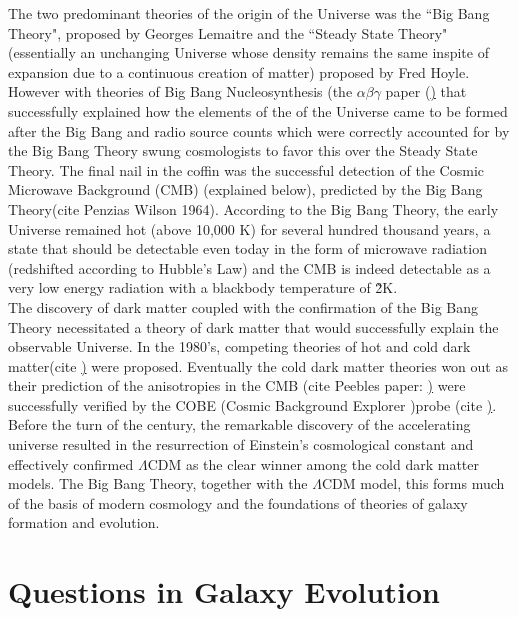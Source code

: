 The two predominant theories of the origin of the Universe was the ``Big Bang Theory", proposed by Georges Lemaitre and the ``Steady State Theory"(essentially an unchanging Universe whose density remains the same inspite of expansion due to a continuous creation of matter) proposed by Fred Hoyle. However with theories of Big Bang Nucleosynthesis (the $\alpha\beta\gamma$ paper (\href{http://adsabs.harvard.edu/abs/1948PhRv...73..803A}) that successfully explained how the elements of the of the Universe came to be formed after the Big Bang and radio source counts which were correctly accounted for by the Big Bang Theory swung cosmologists to favor this over the Steady State Theory. The final nail in the coffin was the successful detection of the Cosmic Microwave Background (CMB) (explained below), predicted by the Big Bang Theory(cite Penzias Wilson 1964). According to the Big Bang Theory, the early Universe remained hot (above 10,000 K) for several hundred thousand years, a state that should be detectable even today in the form of microwave radiation (redshifted according to Hubble's Law) and the CMB is indeed detectable as a very low energy radiation with a blackbody temperature of \~ 2K.\\

The discovery of dark matter coupled with the confirmation of the Big Bang Theory necessitated a theory of dark matter that would successfully explain the observable Universe. In the 1980's, competing theories of hot and cold dark matter(cite \href{http://adsabs.harvard.edu/doi/10.1086/163168}) were proposed. Eventually the cold dark matter theories won out as their prediction of the anisotropies in the CMB (cite Peebles paper: \href{http://adsabs.harvard.edu/doi/10.1086/183911}) were successfully verified by the COBE (Cosmic Background Explorer )probe (cite \href{http://adsabs.harvard.edu/abs/1992ApJ...396L...1S}).\\

Before the turn of the century, the remarkable discovery of the accelerating universe resulted in the resurrection of Einstein's cosmological constant and effectively confirmed $\Lambda$CDM as the clear winner among the cold dark matter models. The Big Bang Theory, together with the $\Lambda$CDM model, this forms much of the basis of modern cosmology and the foundations of theories of galaxy formation and evolution.\\

\section{Questions in Galaxy Evolution}
